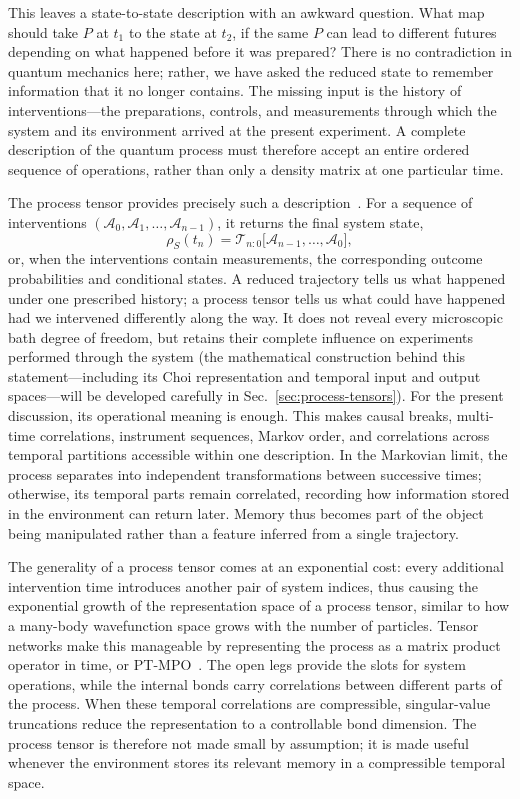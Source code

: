 This leaves a state-to-state description with an awkward question.
What map should take $P$ at $t_1$ to the state at $t_2$, if the same $P$ can lead to different futures depending on what happened before it was prepared?
There is no contradiction in quantum mechanics here; rather, we have asked the reduced state to remember information that it no longer contains.
The missing input is the history of interventions---the preparations, controls, and measurements through which the system and its environment arrived at the present experiment.
A complete description of the quantum process must therefore accept an entire ordered sequence of operations, rather than only a density matrix at one particular time.

The process tensor provides precisely such a description~\cite{Pollock2018Framework,Milz2021,Taranto2025}.
For a sequence of interventions $(\mathcal{A}_0,\mathcal{A}_1,\ldots,\mathcal{A}_{n-1})$, it returns the final system state,
%
\begin{equation}
    \rho_S(t_n)
    = \mathcal{T}_{n:0} \bigl[ \mathcal{A}_{n-1},\ldots,\mathcal{A}_0 \bigr],
\end{equation}
%
or, when the interventions contain measurements, the corresponding outcome probabilities and conditional states.
A reduced trajectory tells us what happened under one prescribed history; a process tensor tells us what could have happened had we intervened differently along the way.
It does not reveal every microscopic bath degree of freedom, but retains their complete influence on experiments performed through the system (the mathematical construction behind this statement---including its Choi representation and temporal input and output spaces---will be developed carefully in Sec.~\ref{sec:process-tensors}).
For the present discussion, its operational meaning is enough.
This makes causal breaks, multi-time correlations, instrument sequences, Markov order, and correlations across temporal partitions accessible within one description.
In the Markovian limit, the process separates into independent transformations between successive times; otherwise, its temporal parts remain correlated, recording how information stored in the environment can return later.
Memory thus becomes part of the object being manipulated rather than a feature inferred from a single trajectory.

The generality of a process tensor comes at an exponential cost: every additional intervention time introduces another pair of system indices, thus causing the exponential growth of the representation space of a process tensor, similar to how a many-body wavefunction space grows with the number of particles.
Tensor networks make this manageable by representing the process as a matrix product operator in time, or PT-MPO~\cite{Jorgensen2019}.
The open legs provide the slots for system operations, while the internal bonds carry correlations between different parts of the process.
When these temporal correlations are compressible, singular-value truncations reduce the representation to a controllable bond dimension.
The process tensor is therefore not made small by assumption; it is made useful whenever the environment stores its relevant memory in a compressible temporal space.

